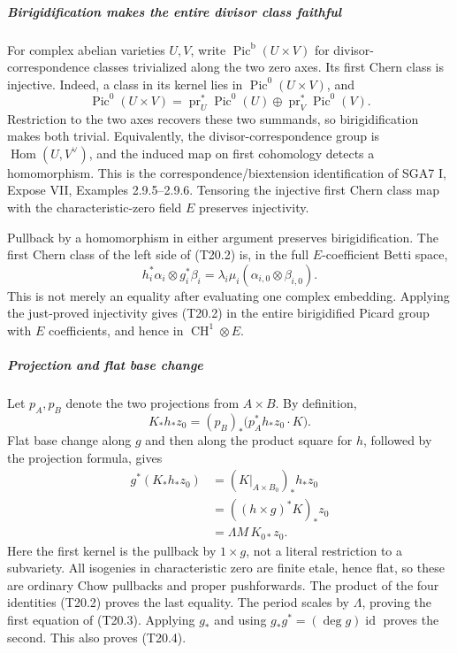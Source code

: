 \documentclass[11pt,a4paper]{article}
\theoremstyle{definition}
\begin{document}
\subparagraph{Birigidification makes the entire divisor class faithful}\label{birigidification-makes-the-entire-divisor-class-faithful}

For complex abelian varieties \(U,V\), write \(\operatorname{Pic}^{\mathrm b}(U\times V)\) for divisor-correspondence classes trivialized along the two zero axes. Its first Chern class is injective. Indeed, a class in its kernel lies in \(\operatorname{Pic}^0(U\times V)\), and \[
 \operatorname{Pic}^0(U\times V)
 =\operatorname{pr}_U^*\operatorname{Pic}^0(U)
  \oplus\operatorname{pr}_V^*\operatorname{Pic}^0(V).
\] Restriction to the two axes recovers these two summands, so birigidification makes both trivial. Equivalently, the divisor-correspondence group is \(\operatorname{Hom}(U,V^\vee)\), and the induced map on first cohomology detects a homomorphism. This is the correspondence/biextension identification of SGA7 I, Expose VII, Examples 2.9.5--2.9.6. Tensoring the injective first Chern class map with the characteristic-zero field \(E\) preserves injectivity.

Pullback by a homomorphism in either argument preserves birigidification. The first Chern class of the left side of (T20.2) is, in the full \(E\)-coefficient Betti space, \[
 h_i^*\alpha_i\otimes g_i^*\beta_i
   =\lambda_i\mu_i(\alpha_{i,0}\otimes\beta_{i,0}).
\] This is not merely an equality after evaluating one complex embedding. Applying the just-proved injectivity gives (T20.2) in the entire birigidified Picard group with \(E\) coefficients, and hence in \(\operatorname{CH}^1\otimes E\).

\subparagraph{Projection and flat base change}\label{projection-and-flat-base-change}

Let \(p_A,p_B\) denote the two projections from \(A\times B\). By definition, \[
 K_*h_*z_0=(p_B)_*\bigl(p_A^*h_*z_0\cdot K\bigr).
\] Flat base change along \(g\) and then along the product square for \(h\), followed by the projection formula, gives \[
 \begin{aligned}
 g^*(K_*h_*z_0)
 &= (K|_{A\times B_0})_*h_*z_0\\
 &= ((h\times g)^*K)_*z_0\\
 &=\Lambda M\,K_{0*}z_0.
 \end{aligned}
 \tag{T20.12}
\] Here the first kernel is the pullback by \(1\times g\), not a literal restriction to a subvariety. All isogenies in characteristic zero are finite etale, hence flat, so these are ordinary Chow pullbacks and proper pushforwards. The product of the four identities (T20.2) proves the last equality. The period scales by \(\Lambda\), proving the first equation of (T20.3). Applying \(g_*\) and using \(g_*g^*=(\deg g)\operatorname{id}\) proves the second. This also proves (T20.4).
\end{document}
